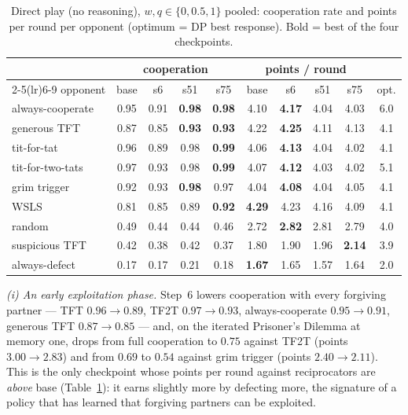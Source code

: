 \documentclass{article}
\begin{document}
\begin{table}[h]
\centering\small
\caption{Direct play (no reasoning), $w,q\in\{0,0.5,1\}$ pooled: cooperation
rate and points per round per opponent (optimum = DP best response). Bold =
best of the four checkpoints.}
\label{tab:nothink}
\begin{tabular}{l cccc cccc c}
\toprule
& \multicolumn{4}{c}{cooperation} & \multicolumn{4}{c}{points / round} & \\
\cmidrule(lr){2-5}\cmidrule(lr){6-9}
opponent & base & s6 & s51 & s75 & base & s6 & s51 & s75 & opt. \\
\midrule
always-cooperate & 0.95 & 0.91 & \textbf{0.98} & \textbf{0.98} & 4.10 & \textbf{4.17} & 4.04 & 4.03 & 6.0 \\
generous TFT     & 0.87 & 0.85 & \textbf{0.93} & \textbf{0.93} & 4.22 & \textbf{4.25} & 4.11 & 4.13 & 4.1 \\
tit-for-tat      & 0.96 & 0.89 & 0.98 & \textbf{0.99} & 4.06 & \textbf{4.13} & 4.04 & 4.02 & 4.1 \\
tit-for-two-tats & 0.97 & 0.93 & 0.98 & \textbf{0.99} & 4.07 & \textbf{4.12} & 4.03 & 4.02 & 5.1 \\
grim trigger     & 0.92 & 0.93 & \textbf{0.98} & 0.97 & 4.04 & \textbf{4.08} & 4.04 & 4.05 & 4.1 \\
WSLS             & 0.81 & 0.85 & 0.89 & \textbf{0.92} & \textbf{4.29} & 4.23 & 4.16 & 4.09 & 4.1 \\
random           & 0.49 & 0.44 & 0.44 & 0.46 & 2.72 & \textbf{2.82} & 2.81 & 2.79 & 4.0 \\
suspicious TFT   & 0.42 & 0.38 & 0.42 & 0.37 & 1.80 & 1.90 & 1.96 & \textbf{2.14} & 3.9 \\
always-defect    & 0.17 & 0.17 & 0.21 & 0.18 & \textbf{1.67} & 1.65 & 1.57 & 1.64 & 2.0 \\
\bottomrule
\end{tabular}
\end{table}

\emph{(i) An early exploitation phase.} Step~6 lowers cooperation with every
forgiving partner --- TFT $0.96\to0.89$, TF2T $0.97\to0.93$, always-cooperate
$0.95\to0.91$, generous TFT $0.87\to0.85$ --- and, on the iterated Prisoner's
Dilemma at memory one, drops from full cooperation to $0.75$ against TF2T
(points $3.00\to2.83$) and from $0.69$ to $0.54$ against grim trigger
(points $2.40\to2.11$). This is the only checkpoint whose points per round
against reciprocators are \emph{above} base (Table~\ref{tab:nothink}): it earns
slightly more by defecting more, the signature of a policy that has learned
that forgiving partners can be exploited.
\end{document}
